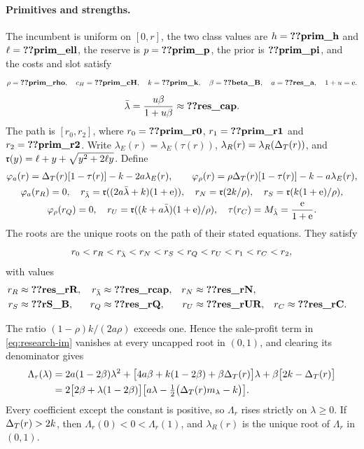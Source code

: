 \paragraph{Primitives and strengths.}
The incumbent is uniform on \([0,r]\), the two class values are \(h=\reg{prim_h}\) and \(\ell=\reg{prim_ell}\),
the reserve is \(p=\reg{prim_p}\), the prior is \(\reg{prim_pi}\), and the costs and slot satisfy
\[
 \rho=\reg{prim_rho},\quad c_H=\reg{prim_cH},\quad k=\reg{prim_k},\quad
 \beta=\reg{beta_B},\quad a=\reg{res_a},\quad 1+u=\eu.
\]
\[
 \lb=\frac{u\beta}{1+u\beta}\approx\reg{res_cap}.
\]
The path is \([r_0,r_2]\), where \(r_0=\reg{prim_r0}\), \(r_1=\reg{prim_r1}\) and \(r_2=\reg{prim_r2}\).
Write \(\lambda_E(r)=\lambda_E(\tau(r))\), \(\lambda_R(r)=\lambda_R(\Delta_T(r))\), and
\(\mathfrak{r}(y)=\ell+y+\sqrt{y^2+2\ell y}\). Define
\begin{gather*}
 \varphi_a(r)=\Delta_T(r)[1-\tau(r)]-k-2a\lambda_E(r),\qquad
 \varphi_\rho(r)=\rho\Delta_T(r)[1-\tau(r)]-k-a\lambda_E(r),\\
 \varphi_a(r_R)=0,\quad r_{\bar\lambda}=\mathfrak{r}((2a\bar\lambda+k)(1+\mathrm{e})),\quad
 r_N=\mathfrak{r}(2k/\rho),\quad r_S=\mathfrak{r}(k(1+\mathrm{e})/\rho),\\
 \varphi_\rho(r_Q)=0,\quad r_U=\mathfrak{r}((k+a\bar\lambda)(1+\mathrm{e})/\rho),\quad
 \tau(r_C)=M_{\bar\lambda}=\frac{\mathrm{e}}{1+\mathrm{e}}.
\end{gather*}
The roots are the unique roots on the path of their stated equations. They satisfy
\[
 r_0<r_R<r_{\bar\lambda}<r_N<r_S<r_Q<r_U<r_1<r_C<r_2,
\]
with values
\begin{align*}
 r_R&\approx\reg{res_rR},&r_{\lb}&\approx\reg{res_rcap},&r_N&\approx\reg{res_rN},\\
 r_S&\approx\reg{rS_B},&r_Q&\approx\reg{res_rQ},&r_U&\approx\reg{res_rUR},&r_C&\approx\reg{res_rC}.
\end{align*}

The ratio \((1-\rho)k/(2a\rho)\) exceeds one. Hence the sale-profit term in
\eqref{eq:research-im} vanishes at every uncapped root in \((0,1)\), and clearing its denominator gives
\begin{equation}\label{eq:a5-F}
\begin{aligned}
\Lambda_r(\lambda)&=2a(1-2\beta)\lambda^2+\bigl[4a\beta+k(1-2\beta)+\beta\Delta_T(r)\bigr]\lambda+\beta\bigl[2k-\Delta_T(r)\bigr]\\
&=2\bigl[2\beta+\lambda(1-2\beta)\bigr]\bigl[a\lambda-\tfrac12\bigl(\Delta_T(r)m_\lambda-k\bigr)\bigr].
\end{aligned}
\end{equation}
Every coefficient except the constant is positive, so \(\Lambda_r\) rises strictly on \(\lambda\ge0\). If \(\Delta_T(r)>2k\),
then \(\Lambda_r(0)<0<\Lambda_r(1)\), and \(\lambda_R(r)\) is the unique root of \(\Lambda_r\) in \((0,1)\).


